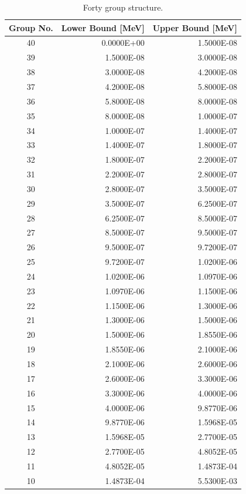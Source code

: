 \begin{appendices}
\begin{table}[h!]
  \centering	
  \footnotesize
  \caption{Forty group structure.}
  \label{table:app-40-groups} 
  \vspace{14pt}
  \begin{tabular}{c r r}
    \toprule
    {\bf Group No.} &
    {\bf Lower Bound [MeV]} &
    {\bf Upper Bound [MeV]} \\
    \midrule
40 & 0.0000E+00 & 1.5000E-08 \\
39 & 1.5000E-08 & 3.0000E-08 \\
38 & 3.0000E-08 & 4.2000E-08 \\
37 & 4.2000E-08 & 5.8000E-08 \\
36 & 5.8000E-08 & 8.0000E-08 \\
35 & 8.0000E-08 & 1.0000E-07 \\
34 & 1.0000E-07 & 1.4000E-07 \\
33 & 1.4000E-07 & 1.8000E-07 \\
32 & 1.8000E-07 & 2.2000E-07 \\
31 & 2.2000E-07 & 2.8000E-07 \\
30 & 2.8000E-07 & 3.5000E-07 \\
29 & 3.5000E-07 & 6.2500E-07 \\
28 & 6.2500E-07 & 8.5000E-07 \\
27 & 8.5000E-07 & 9.5000E-07 \\
26 & 9.5000E-07 & 9.7200E-07 \\
25 & 9.7200E-07 & 1.0200E-06 \\
24 & 1.0200E-06 & 1.0970E-06 \\
23 & 1.0970E-06 & 1.1500E-06 \\
22 & 1.1500E-06 & 1.3000E-06 \\
21 & 1.3000E-06 & 1.5000E-06 \\
20 & 1.5000E-06 & 1.8550E-06 \\
19 & 1.8550E-06 & 2.1000E-06 \\
18 & 2.1000E-06 & 2.6000E-06 \\
17 & 2.6000E-06 & 3.3000E-06 \\
16 & 3.3000E-06 & 4.0000E-06 \\
15 & 4.0000E-06 & 9.8770E-06 \\
14 & 9.8770E-06 & 1.5968E-05 \\
13 & 1.5968E-05 & 2.7700E-05 \\
12 & 2.7700E-05 & 4.8052E-05 \\
11 & 4.8052E-05 & 1.4873E-04 \\
10 & 1.4873E-04 & 5.5300E-03 \\

\end{tabular}
\end{table}
\end{appendices}
